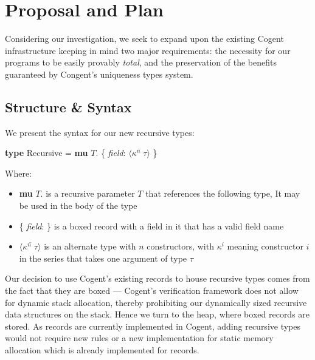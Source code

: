 \chapter{Proposal and Plan}\label{ch:style}

Considering our investigation, we seek to expand upon the existing Cogent infrastructure keeping in mind
two major requirements: the necessity for our programs to be easily provably \textit{total}, and the preservation 
of the benefits guaranteed by Congent's uniqueness types system.



\section{Structure \& Syntax}

We present the syntax for our new recursive types:

\begin{center}
    \textbf{type} Recursive = \textbf{mu} $T$. \{ \textit{field}: $\langle \overline{\kappa^n\; \tau} \rangle$ \}
\end{center}


Where:
\begin{itemize}
   \item
        \textbf{mu} $T$. is a recursive parameter $T$ that references the following type,
        It may be used in the body of the type
    \item
        \{ \textit{field}: \} is a boxed record with a field in it that has a valid field name
    \item 
        $\langle \overline{\kappa^n\; \tau} \rangle$ is an alternate type with $n$ constructors, 
        with $\kappa^i$ meaning constructor $i$ in the series that takes one argument of type $\tau$
\end{itemize}

Our decision to use Cogent's existing records to house recursive types comes from the fact that they are boxed ---
Cogent's verification framework does not allow for dynamic stack allocation, thereby prohibiting
our dynamically sized recursive data structures on the stack. Hence we turn to the heap,
where boxed records are stored. As records are currently implemented in Cogent, adding recursive
types would not require new rules or a new implementation for static memory allocation which
is already implemented for records.

